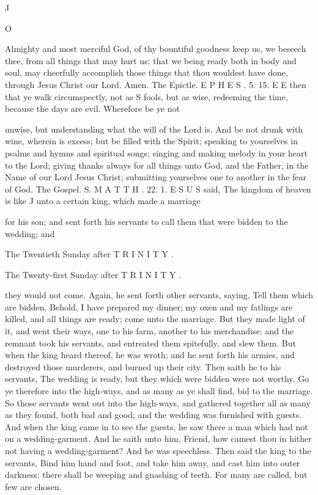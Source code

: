 J

O

Almighty and most merciful God, of thy bountiful goodness keep us, we beseech thee, from all things that may hurt us; that we being ready both in body and soul, may cheerfully accomplish those things that thou wouldest have done, through Jesus Christ our Lord. Amen. The Epictle. E P H E S . 5. 15. E E then that ye walk circumspectly, not as S fools, but as wise, redeeming the time, because the days are evil. Wherefore be ye not

unwise, but understanding what the will of the Lord is. And be not drunk with wine, wherein is excess; but be filled with the Spirit; speaking to yourselves in psalms and hymns and spiritual songs; singing and making melody in your heart to the Lord; giving thanks always for all things unto God, and the Father, in the Name of our Lord Jesus Christ; submitting yourselves one to another in the fear of God. The Gospel. S. M A T T H . 22. 1. E S U S said, The kingdom of heaven is like J unto a certain king, which made a marriage

for his son; and sent forth his servants to call them that were bidden to the wedding; and

The Twentieth Sunday after T R I N I T Y .

The Twenty-first Sunday after T R I N I T Y .

they would not come. Again, he sent forth other servants, saying, Tell them which are bidden, Behold, I have prepared my dinner; my oxen and my fatlings are killed, and all things are ready; come unto the marriage. But they made light of it, and went their ways, one to his farm, another to his merchandise: and the remnant took his servants, and entreated them spitefully, and slew them. But when the king heard thereof, he was wroth; and he sent forth his armies, and destroyed those murderers, and burned up their city. Then saith he to his servants, The wedding is ready, but they which were bidden were not worthy. Go ye therefore into the high-ways, and as many as ye shall find, bid to the marriage. So those servants went out into the high-ways, and gathered together all as many as they found, both bad and good; and the wedding was furnished with guests. And when the king came in to see the guests, he saw there a man which had not on a wedding-garment. And he saith unto him, Friend, how camest thou in hither not having a wedding-garment? And he was speechless. Then said the king to the servants, Bind him hand and foot, and take him away, and cast him into outer darkness: there shall be weeping and gnashing of teeth. For many are called, but few are chosen.

